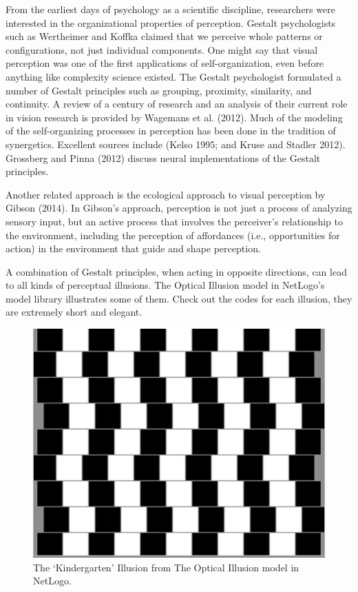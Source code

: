 \documentclass[
  a4paper,
  DIV=11,
  numbers=noendperiod]{scrreprt}
\begin{document}
From the earliest days of psychology as a scientific discipline,
researchers were interested in the organizational properties of
perception. Gestalt psychologists such as Wertheimer and Koffka claimed
that we perceive whole patterns or configurations, not just individual
components. One might say that visual perception was one of the first
applications of self-organization, even before anything like complexity
science existed. The Gestalt psychologist formulated a number of Gestalt
principles such as grouping, proximity, similarity, and continuity. A
review of a century of research and an analysis of their current role in
vision research is provided by Wagemans et al. (2012). Much of the
modeling of the self-organizing processes in perception has been done in
the tradition of synergetics. Excellent sources include (Kelso 1995; and
Kruse and Stadler 2012). Grossberg and Pinna (2012) discuss neural
implementations of the Gestalt principles.

Another related approach is the ecological approach to visual perception
by Gibson (2014). In Gibson's approach, perception is not just a process
of analyzing sensory input, but an active process that involves the
perceiver's relationship to the environment, including the perception of
affordances (i.e., opportunities for action) in the environment that
guide and shape perception.

A combination of Gestalt principles, when acting in opposite directions,
can lead to all kinds of perceptual illusions. The Optical Illusion
model in NetLogo's model library illustrates some of them. Check out the
codes for each illusion, they are extremely short and elegant.

\begin{figure}

{\centering \includegraphics{media/ch5n/image6.jpg}

}

\caption{\label{fig-ch5n-img6-old-44}The `Kindergarten' Illusion from
The Optical Illusion model in NetLogo.}

\end{figure}
\end{document}

